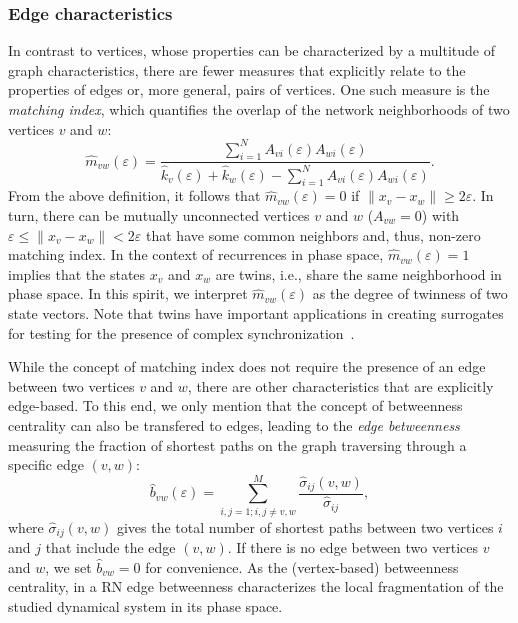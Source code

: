         
  		\subsubsection{Edge characteristics}
        
In contrast to vertices, whose properties can be characterized by a multitude of graph characteristics, there are fewer measures that explicitly relate to the properties of edges or, more general, pairs of vertices. One such measure is the \textit{matching index}, which quantifies the overlap of the network neighborhoods of two vertices $v$ and $w$:
\begin{equation}
\hat{m}_{vw}(\varepsilon)=\frac{\sum_{i=1}^N A_{vi}(\varepsilon) A_{wi}(\varepsilon)}{\hat{k}_v(\varepsilon)+\hat{k}_w(\varepsilon)-\sum_{i=1}^N A_{vi}(\varepsilon) A_{wi}(\varepsilon)}.
\label{eq:matching}
\end{equation}
\noindent
From the above definition, it follows that $\hat{m}_{vw}(\varepsilon)=0$ if $\|x_v-x_w\|\geq 2\varepsilon$. In turn, there can be mutually unconnected vertices $v$ and $w$ ($A_{vw}=0$) with $\varepsilon\leq \|x_v-x_w\|< 2\varepsilon$ that have some common neighbors and, thus, non-zero matching index. In the context of recurrences in phase space, $\hat{m}_{vw}(\varepsilon)=1$ implies that the states $x_v$ and $x_w$ are twins, i.e., share the same neighborhood in phase space. In this spirit, we interpret $\hat{m}_{vw}(\varepsilon)$ as the degree of twinness of two state vectors. Note that twins have important applications in creating surrogates for testing for the presence of complex synchronization~\cite{Thiel2006,Romano2009}.

While the concept of matching index does not require the presence of an edge between two vertices $v$ and $w$, there are other characteristics that are explicitly edge-based. To this end, we only mention that the concept of betweenness centrality can also be transfered to edges, leading to the \textit{edge betweenness} measuring the fraction of shortest paths on the graph traversing through a specific edge $(v,w)$:
\begin{equation}
\hat{b}_{vw}(\varepsilon)=\sum_{i,j=1; i,j\neq v,w}^M \frac{\hat{\sigma}_{ij}(v,w)}{\hat{\sigma}_{ij}},
\label{eq:edgebetweenness}
\end{equation}
\noindent
where $\hat{\sigma}_{ij}(v,w)$ gives the total number of shortest paths between two vertices $i$ and $j$ that include the edge $(v,w)$. If there is no edge between two vertices $v$ and $w$, we set $\hat{b}_{vw}=0$ for convenience. As the (vertex-based) betweenness centrality, in a RN edge betweenness characterizes the local fragmentation of the studied dynamical system in its phase space.
        
